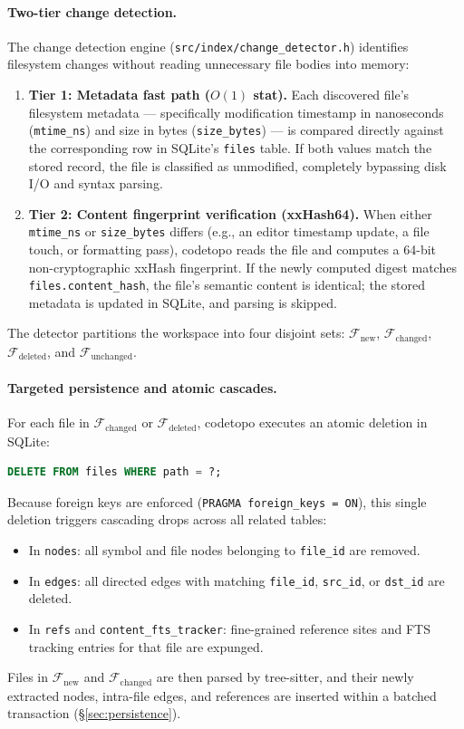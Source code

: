 \paragraph{Two-tier change detection.} The change detection engine (\texttt{src/\allowbreak index/\allowbreak change\_detector.h})
identifies filesystem changes without reading unnecessary file bodies into memory:
\begin{enumerate}
  \item \textbf{Tier 1: Metadata fast path ($O(1)$ stat).} Each discovered file's filesystem metadata
        --- specifically modification timestamp in nanoseconds (\texttt{mtime\_ns}) and size in bytes
        (\texttt{size\_bytes}) --- is compared directly against the corresponding row in SQLite's
        \texttt{files} table. If both values match the stored record, the file is classified as
        unmodified, completely bypassing disk I/O and syntax parsing.
  \item \textbf{Tier 2: Content fingerprint verification (xxHash64).} When either \texttt{mtime\_ns} or
        \texttt{size\_bytes} differs (e.g., an editor timestamp update, a file touch, or formatting pass),
        codetopo reads the file and computes a 64-bit non-cryptographic xxHash fingerprint. If the newly
        computed digest matches \texttt{files.content\_hash}, the file's semantic content is identical;
        the stored metadata is updated in SQLite, and parsing is skipped.
\end{enumerate}
The detector partitions the workspace into four disjoint sets: $\mathcal{F}_{\text{new}}$,
$\mathcal{F}_{\text{changed}}$, $\mathcal{F}_{\text{deleted}}$, and $\mathcal{F}_{\text{unchanged}}$.

\paragraph{Targeted persistence and atomic cascades.} For each file in $\mathcal{F}_{\text{changed}}$
or $\mathcal{F}_{\text{deleted}}$, codetopo executes an atomic deletion in SQLite:
\begin{lstlisting}[language=sql]
DELETE FROM files WHERE path = ?;
\end{lstlisting}
Because foreign keys are enforced (\texttt{PRAGMA foreign\_keys = ON}), this single deletion triggers
cascading drops across all related tables:
\begin{itemize}
  \item In \texttt{nodes}: all symbol and file nodes belonging to \texttt{file\_id} are removed.
  \item In \texttt{edges}: all directed edges with matching \texttt{file\_id}, \texttt{src\_id}, or
        \texttt{dst\_id} are deleted.
  \item In \texttt{refs} and \texttt{content\_fts\_tracker}: fine-grained reference sites and FTS tracking
        entries for that file are expunged.
\end{itemize}
Files in $\mathcal{F}_{\text{new}}$ and $\mathcal{F}_{\text{changed}}$ are then parsed by tree-sitter,
and their newly extracted nodes, intra-file edges, and references are inserted within a batched
transaction (\S\ref{sec:persistence}).


